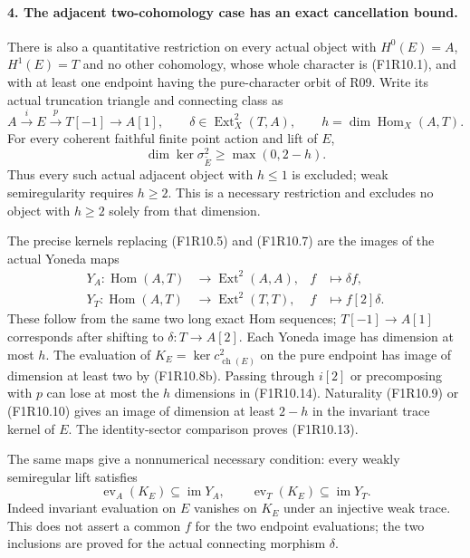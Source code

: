 \paragraph{4. The adjacent two-cohomology case has an exact cancellation bound.}
There is also a quantitative restriction on every actual object
with $H^0(E)=A$, $H^1(E)=T$ and no other cohomology, whose whole
character is (F1R10.1), and with at least one endpoint having
the pure-character orbit of R09. Write its actual truncation
triangle and connecting class as
\[
 A\xrightarrow{i}E\xrightarrow{p}T[-1]
       \longrightarrow A[1],\qquad
 \delta\in\operatorname{Ext}^2_X(T,A),\qquad
 h=\dim\operatorname{Hom}_X(A,T).
 \tag{F1R10.12}
\]
For every coherent faithful finite point action and lift of $E$,
\[
        \dim\ker\sigma^2_{\widetilde E}\ge\max(0,2-h).
 \tag{F1R10.13}
\]
Thus every such actual adjacent object with $h\le1$ is excluded;
weak semiregularity requires $h\ge2$. This is a necessary
restriction and excludes no object with $h\ge2$ solely from
that dimension.

The precise kernels replacing (F1R10.5) and (F1R10.7) are
the images of the actual Yoneda maps
\[
 \begin{aligned}
 Y_A:\operatorname{Hom}(A,T)&\longrightarrow
                     \operatorname{Ext}^2(A,A),
             &f&\longmapsto\delta f,\\
 Y_T:\operatorname{Hom}(A,T)&\longrightarrow
                     \operatorname{Ext}^2(T,T),
             &f&\longmapsto f[2]\delta.
 \end{aligned}
 \tag{F1R10.14}
\]
These follow from the same two long exact Hom sequences;
$T[-1]\to A[1]$ corresponds after shifting to
$\delta:T\to A[2]$. Each Yoneda image has dimension at most $h$.
The evaluation of $K_E=\ker c^2_{\operatorname{ch}(E)}$ on the
pure endpoint has image of dimension at least two by
(F1R10.8b). Passing through $i[2]$ or precomposing with $p$
can lose at most the $h$ dimensions in (F1R10.14).
Naturality (F1R10.9) or (F1R10.10) gives an image of
dimension at least $2-h$ in the invariant trace kernel of $E$.
The identity-sector comparison proves (F1R10.13).

The same maps give a nonnumerical necessary condition: every
weakly semiregular lift satisfies
\[
 \operatorname{ev}_A(K_E)\subseteq\operatorname{im}Y_A,\qquad
 \operatorname{ev}_T(K_E)\subseteq\operatorname{im}Y_T.
 \tag{F1R10.15}
\]
Indeed invariant evaluation on $E$ vanishes on $K_E$ under
an injective weak trace. This does not assert a common
$f$ for the two endpoint evaluations; the two inclusions
are proved for the actual connecting morphism $\delta$.
